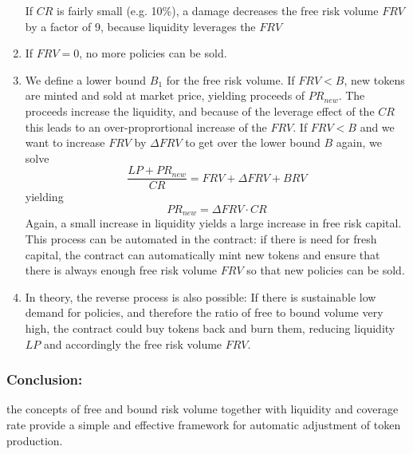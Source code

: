 \documentclass[runningheads,a4paper]{llncs}
\begin{document}
\begin{enumerate}
    If $CR$ is fairly small (e.g. 10\%), a damage decreases the free risk volume $FRV$  by a factor of 9, because
    liquidity leverages the $FRV$ 
    \item If $ FRV = 0$, no more policies can be sold. 
    \item We define a lower bound $B_1$ for the free risk volume. If $ FRV < B $, 
    new tokens are minted and sold at market price, yielding proceeds of $PR_{new}$. 
    The proceeds increase the liquidity, and because of the leverage effect of the $CR$ this leads 
    to an over-proprortional increase of the $FRV$. 
    If $FRV < B$ and we want to increase $FRV$ by $\Delta FRV$ to get over the lower bound $B$ again, we solve
    \begin{equation} \label{eq:growth} \frac{LP + PR_{new}}{CR} = FRV + \Delta FRV + BRV  \end{equation} yielding
    \begin{equation} \label{eq:delta_PR} {PR_{new}} = \Delta FRV\cdot CR \end{equation}
    Again, a small increase in liquidity yields a large increase in free risk capital.
    This process can be automated in the contract: if there is need for fresh capital, the contract can 
    automatically mint new tokens and ensure that there is always enough free risk volume $FRV$ so that 
    new policies can be sold.
    \item In theory, the reverse process is also possible: If there is sustainable low demand for policies,
    and therefore the ratio of free to bound volume very high, the contract could buy tokens back and burn them,
    reducing liquidity $LP$ and accordingly the free risk volume $FRV$. 
\end{enumerate}
\subsubsection{Conclusion:} the concepts of free and bound risk volume together with liquidity and coverage rate
provide a simple and effective framework for automatic adjustment of token production. 
\end{document}
